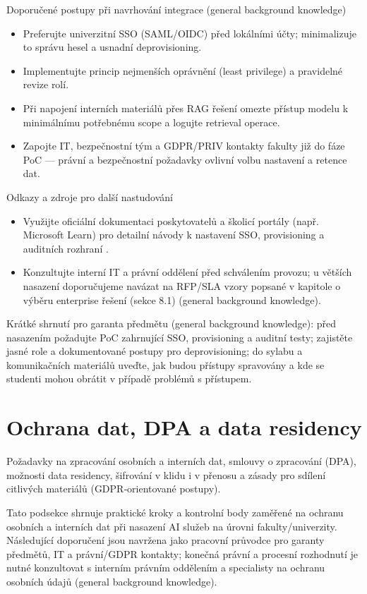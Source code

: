 \documentclass{report}%
\begin{document}
Doporučené postupy při navrhování integrace (general background knowledge)
\begin{itemize}
  \item Preferujte univerzitní SSO (SAML/OIDC) před lokálními účty; minimalizuje to správu hesel a usnadní deprovisioning.
  \item Implementujte princip nejmenších oprávnění (least privilege) a pravidelné revize rolí.
  \item Při napojení interních materiálů přes RAG řešení omezte přístup modelu k minimálnímu potřebnému scope a logujte retrieval operace.
  \item Zapojte IT, bezpečnostní tým a GDPR/PRIV kontakty fakulty již do fáze PoC — právní a bezpečnostní požadavky ovlivní volbu nastavení a retence dat.
\end{itemize}

Odkazy a zdroje pro další nastudování
\begin{itemize}
  \item Využijte oficiální dokumentaci poskytovatelů a školicí portály (např. Microsoft Learn) pro detailní návody k nastavení SSO, provisioning a auditních rozhraní \cite{kb_ai_101_tipu_pdf_04e4a115_page_54_1}.
  \item Konzultujte interní IT a právní oddělení před schválením provozu; u větších nasazení doporučujeme navázat na RFP/SLA vzory popsané v kapitole o výběru enterprise řešení (sekce 8.1) (general background knowledge).
\end{itemize}

Krátké shrnutí pro garanta předmětu (general background knowledge): před nasazením požadujte PoC zahrnující SSO, provisioning a auditní testy; zajistěte jasné role a dokumentované postupy pro deprovisioning; do sylabu a komunikačních materiálů uveďte, jak budou přístupy spravovány a kde se studenti mohou obrátit v případě problémů s přístupem.%

%
\section{Ochrana dat, DPA a data residency}%
Požadavky na zpracování osobních a interních dat, smlouvy o zpracování (DPA), možnosti data residency, šifrování v klidu i v přenosu a zásady pro sdílení citlivých materiálů (GDPR‑orientované postupy).%


%
Tato podsekce shrnuje praktické kroky a kontrolní body zaměřené na ochranu osobních a interních dat při nasazení AI služeb na úrovni fakulty/univerzity. Následující doporučení jsou navržena jako pracovní průvodce pro garanty předmětů, IT a právní/GDPR kontakty; konečná právní a procesní rozhodnutí je nutné konzultovat s interním právním oddělením a specialisty na ochranu osobních údajů (general background knowledge).
\end{document}
